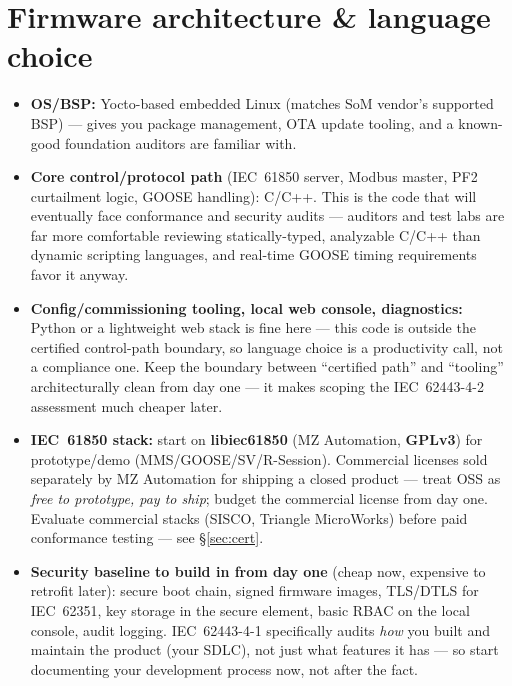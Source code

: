 \documentclass[11pt,a4paper]{article}
\begin{document}
\section{Firmware architecture \& language choice}

\begin{itemize}[leftmargin=*]
  \item \textbf{OS/BSP:} Yocto-based embedded Linux (matches SoM vendor's supported BSP) --- gives you package management,
        OTA update tooling, and a known-good foundation auditors are familiar with.
  \item \textbf{Core control/protocol path} (IEC~61850 server, Modbus master, PF2 curtailment logic, GOOSE handling):
        C/C++. This is the code that will eventually face conformance and security audits --- auditors and test labs are far
        more comfortable reviewing statically-typed, analyzable C/C++ than dynamic scripting languages, and real-time GOOSE
        timing requirements favor it anyway.
  \item \textbf{Config/commissioning tooling, local web console, diagnostics:} Python or a lightweight web stack is fine here ---
        this code is outside the certified control-path boundary, so language choice is a productivity call, not a compliance one.
        Keep the boundary between ``certified path'' and ``tooling'' architecturally clean from day one --- it makes scoping the
        IEC~62443-4-2 assessment much cheaper later.
  \item \textbf{IEC~61850 stack:} start on \textbf{libiec61850} (MZ Automation, \textbf{GPLv3}) for prototype/demo
  (MMS/GOOSE/SV/R-Session). Commercial licenses sold separately by MZ Automation for shipping a closed product ---
  treat OSS as \emph{free to prototype, pay to ship}; budget the commercial license from day one.
  Evaluate commercial stacks (SISCO, Triangle MicroWorks) before paid conformance testing --- see \S\ref{sec:cert}.
  \item \textbf{Security baseline to build in from day one} (cheap now, expensive to retrofit later): secure boot chain, signed
        firmware images, TLS/DTLS for IEC~62351, key storage in the secure element, basic RBAC on the local console, audit logging.
        IEC~62443-4-1 specifically audits \emph{how} you built and maintain the product (your SDLC), not just what features it has ---
        so start documenting your development process now, not after the fact.
\end{itemize}
\end{document}
